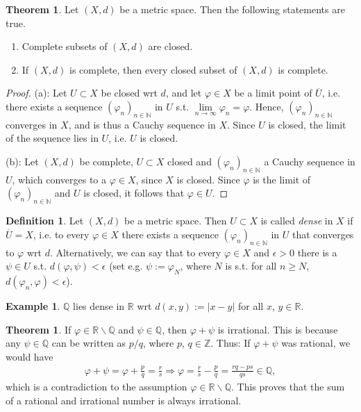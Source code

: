 \documentclass[12pt, a4paper]{article}
\numberwithin{equation}{section}
\theoremstyle{definition}
\theoremstyle{definition}
\newtheorem{defn}[thm]{Definition} %
\newtheorem{exmp}[thm]{Example} %
\newtheorem{theorem}[thm]{Theorem}
\newcommand{\abs}[1]{\left\vert #1 \right\vert}
\begin{document}
	\begin{theorem}
		Let $(X, d)$ be a metric space. Then the following statements are true.
		\begin{enumerate}[label=(\alph*)]
			\item Complete subsets of $(X, d)$ are closed. \vspace{-0.3cm}
			\item If $(X, d)$ is complete, then every closed subset of $(X, d)$ is complete.
		\end{enumerate}
	\end{theorem}

	\begin{proof}
		(a): Let $U\subset X$ be closed wrt $d$, and let $\varphi\in X$ be a limit point of $\overline{U}$, i.e. there exists a sequence $\left(\varphi_{n}\right)_{n\in\mathbb N}$ in $U$ s.t. $\lim\limits_{n\to\infty}\varphi_n = \varphi$. Hence, $\left(\varphi_{n}\right)_{n\in\mathbb N}$ converges in $X$, and is thus a Cauchy sequence in $X$. Since $U$ is closed, the limit of the sequence lies in $U$, i.e. $U$ is closed.
		
		(b): Let $(X, d)$ be complete, $U\subset X$ closed and $(\varphi_n)_{n\in\mathbb N}$ a Cauchy sequence in $U$, which converges to a $\varphi\in X$, since $X$ is closed. Since $\varphi$ is the limit of $(\varphi_n)_{n\in\mathbb N}$ and $U$ is closed, it follows that $\varphi\in U$.
	\end{proof}

	\begin{defn}
		Let $(X, d)$ be a metric space. Then $U\subset X$ is called \textit{dense} in $X$ if $\overline{U} = X$, i.e. to every $\varphi\in X$ there exists a sequence $\left(\varphi_n\right)_{n\in\mathbb N}$ in $U$ that converges to $\varphi$ wrt $d$. Alternatively, we can say that to every $\varphi\in X$ and $\epsilon > 0$ there is a $\psi\in U$ s.t. $d(\varphi, \psi) < \epsilon$ (set e.g. $\psi := \varphi_N$, where $N$ is s.t. for all $n\geq N$, $d(\varphi_n, \varphi) < \epsilon$).
	\end{defn}

	\begin{exmp}
		$\mathbb Q$ lies dense in $\mathbb R$ wrt $d(x, y) := \abs{x - y}$ for all $x$, $y\in\mathbb R$.
	\end{exmp}

	\begin{theorem}\label{remark:sum-rational-irrational}
		If $\varphi\in\mathbb R\backslash \mathbb Q$ and $\psi\in\mathbb Q$, then $\varphi + \psi$ is irrational. This is because any $\psi \in \mathbb Q$ can be written as $p/q$, where $p$, $q\in\mathbb Z$. Thus: If $\varphi + \psi$ was rational, we would have
		\begin{align}
			\varphi + \psi = \varphi + \frac{p}{q} = \frac{r}{s} \Rightarrow \varphi = \frac{r}{s} - \frac{p}{q} = \frac{rq - ps}{qs} \in \mathbb Q,
		\end{align}
		which is a contradiction to the assumption $\varphi\in\mathbb R\backslash\mathbb Q$. This proves that the sum of a rational and irrational number is always irrational.
	\end{theorem}
\end{document}
